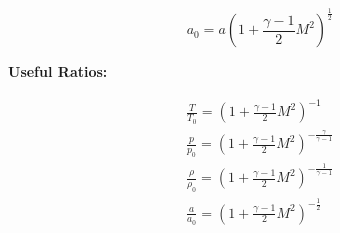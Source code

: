 \begin{equation}
	a_0 = a \left( 1 + \frac{\gamma - 1}{2} M^2 \right)^{\frac{1}{2}}
\end{equation}

\textbf{Useful Ratios:}

\begin{gather}
	\frac{T}{T_0} = \left( 1 + \frac{\gamma - 1}{2} M^2 \right)^{-1} \\
	\frac{p}{p_0} = \left( 1 + \frac{\gamma - 1}{2} M^2 \right)^{-\frac{\gamma}{\gamma - 1}} \\
	\frac{\rho}{\rho_0} = \left( 1 + \frac{\gamma - 1}{2} M^2 \right)^{-\frac{1}{\gamma - 1}} \\
	\frac{a}{a_0} = \left( 1 + \frac{\gamma - 1}{2} M^2 \right)^{-\frac{1}{2}}
\end{gather}
